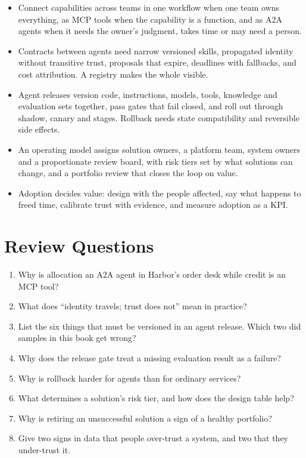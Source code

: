 \begin{itemize}[itemsep=2pt]
  \item Connect capabilities across teams in one workflow when one team owns everything, as MCP tools when the capability is a function, and as A2A agents when it needs the owner's judgment, takes time or may need a person.
  \item Contracts between agents need narrow versioned skills, propagated identity without transitive trust, proposals that expire, deadlines with fallbacks, and cost attribution. A registry makes the whole visible.
  \item Agent releases version code, instructions, models, tools, knowledge and evaluation sets together, pass gates that fail closed, and roll out through shadow, canary and stages. Rollback needs state compatibility and reversible side effects.
  \item An operating model assigns solution owners, a platform team, system owners and a proportionate review board, with risk tiers set by what solutions can change, and a portfolio review that closes the loop on value.
  \item Adoption decides value: design with the people affected, say what happens to freed time, calibrate trust with evidence, and measure adoption as a KPI.
\end{itemize}

\section*{Review Questions}

\begin{enumerate}[itemsep=2pt]
  \item Why is allocation an A2A agent in Harbor's order desk while credit is an MCP tool?
  \item What does ``identity travels; trust does not'' mean in practice?
  \item List the six things that must be versioned in an agent release. Which two did samples in this book get wrong?
  \item Why does the release gate treat a missing evaluation result as a failure?
  \item Why is rollback harder for agents than for ordinary services?
  \item What determines a solution's risk tier, and how does the design table help?
  \item Why is retiring an unsuccessful solution a sign of a healthy portfolio?
  \item Give two signs in data that people over-trust a system, and two that they under-trust it.
\end{enumerate}
